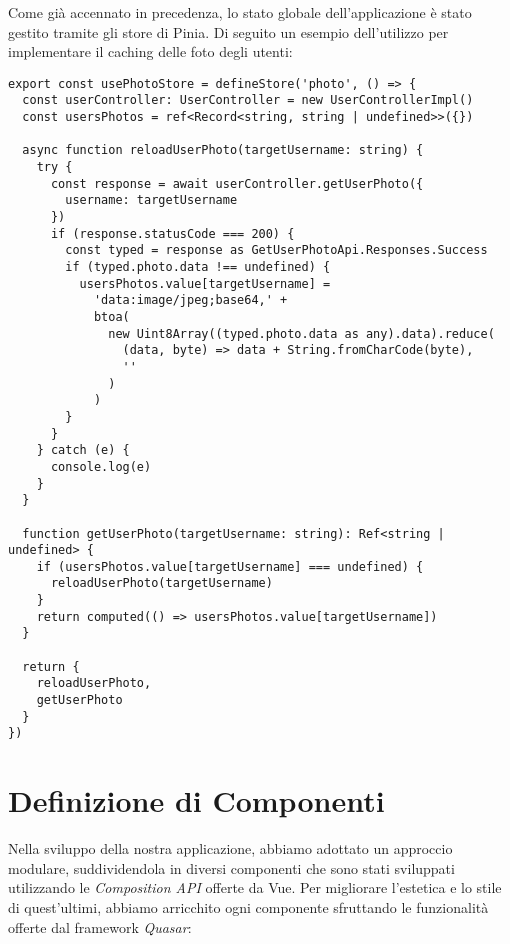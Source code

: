Come già accennato in  precedenza, lo stato globale dell'applicazione è stato gestito tramite gli store di Pinia.
%
Di seguito un esempio dell'utilizzo per implementare il caching delle foto degli utenti:

\begin{lstlisting}[style=typescript, caption={Definizione di uno Store}, label=lst:store]
export const usePhotoStore = defineStore('photo', () => {
  const userController: UserController = new UserControllerImpl()
  const usersPhotos = ref<Record<string, string | undefined>>({})

  async function reloadUserPhoto(targetUsername: string) {
    try {
      const response = await userController.getUserPhoto({
        username: targetUsername
      })
      if (response.statusCode === 200) {
        const typed = response as GetUserPhotoApi.Responses.Success
        if (typed.photo.data !== undefined) {
          usersPhotos.value[targetUsername] =
            'data:image/jpeg;base64,' +
            btoa(
              new Uint8Array((typed.photo.data as any).data).reduce(
                (data, byte) => data + String.fromCharCode(byte),
                ''
              )
            )
        }
      }
    } catch (e) {
      console.log(e)
    }
  }

  function getUserPhoto(targetUsername: string): Ref<string | undefined> {
    if (usersPhotos.value[targetUsername] === undefined) {
      reloadUserPhoto(targetUsername)
    }
    return computed(() => usersPhotos.value[targetUsername])
  }

  return {
    reloadUserPhoto,
    getUserPhoto
  }
})

\end{lstlisting}

%
%
%
\section{Definizione di Componenti}

Nella sviluppo della nostra applicazione, abbiamo adottato un approccio modulare, suddividendola in diversi componenti che sono stati sviluppati utilizzando le \textit{Composition API} offerte da Vue.
%
Per migliorare l'estetica e lo stile di quest'ultimi, abbiamo arricchito ogni componente sfruttando le funzionalità offerte dal framework \textit{Quasar}:

